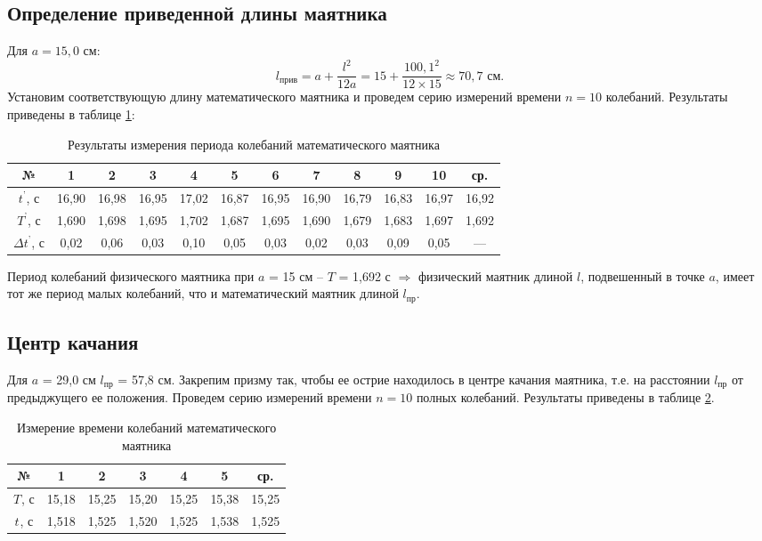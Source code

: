 \documentclass[a4paper,12pt]{article}
\begin{document}
 	\subsection{Определение приведенной длины маятника}
 	Для $a = 15,0$ см:
 	\begin{equation}
 		l_\text{прив} = a + \frac{l^2}{12a} = 15 + \frac{100,1^2}{12\times 15} \approx 70,7 \text{ см.}
 	\end{equation}
 	Установим соответствующую длину математического маятника и проведем серию измерений времени $n = 10$ колебаний. Результаты приведены в таблице \ref{tab3}:
 	\begin{table}[H]
 		\begin{center}
 			\begin{tabular}{|c|c|c|c|c|c|c|c|c|c|c|c|}
 				\hline
 				№ & 1 & 2 & 3 & 4 & 5 & 6 & 7 & 8 & 9 & 10 & ср.\\
 				\hline
 				$t^\text{'}$, с & 16,90 & 16,98 & 16,95 & 17,02 & 16,87 & 16,95 & 16,90 & 16,79 & 16,83 & 16,97 & 16,92\\
 				\hline
 				$T^\text{'}$, с & 1,690 & 1,698 & 1,695 & 1,702 & 1,687 & 1,695 & 1,690 & 1,679 & 1,683 & 1,697 & 1,692\\
 				\hline
 				$\Delta t^\text{'}$, с & 0,02 & 0,06 & 0,03 & 0,10 & 0,05 & 0,03 & 0,02 & 0,03 & 0,09 & 0,05 & ---\\
 				\hline
 			\end{tabular}
 		\end{center}
 		\caption{Результаты измерения периода колебаний математического маятника}
 		\label{tab3}
 	\end{table}
 	
 	Период колебаний физического маятника при $a$ = 15 см -- $T$ = 1,692 с $\Rightarrow$ физический маятник длиной $l$, подвешенный 
 	в точке $a$, имеет тот же период малых колебаний, что и математический 
 	маятник длиной $l_\text{пр}$.
 	
 	\subsection{Центр качания}
 	Для $a$ = 29,0 см $l_\text{пр}$ = 57,8 см. Закрепим призму так, чтобы ее острие находилось в центре качания маятника, т.е. на расстоянии $l_\text{пр}$ от предыджущего ее положения. Проведем серию измерений времени $n = 10$ полных колебаний. Результаты приведены в таблице \ref{tab4}.
 	
 	\begin{table}[H]
 		\begin{center}
 			\begin{tabular}{|c|c|c|c|c|c|c|}
 				\hline
 				№ & 1 & 2 & 3 & 4 & 5 & ср.\\
 				\hline
 				$T^\text{}$, с & 15,18 & 15,25 & 15,20 & 15,25 & 15,38 & 15,25\\
 				\hline
 				$t^\text{}$, с & 1,518 & 1,525 & 1,520 & 1,525 & 1,538 & 1,525\\
 				\hline
 			\end{tabular}
 		\end{center}
 		\caption{Измерение времени колебаний математического маятника}
 		\label{tab4}
 	\end{table}
 	
\end{document}
